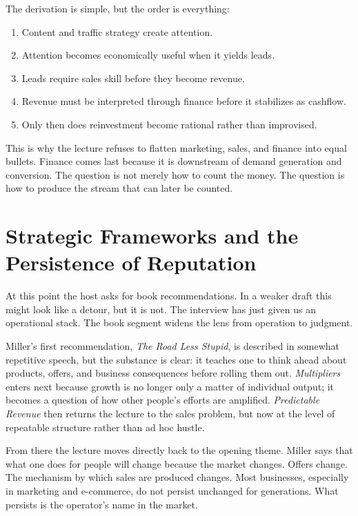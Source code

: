 The derivation is simple, but the order is everything:
\begin{enumerate}
\item Content and traffic strategy create attention.
\item Attention becomes economically useful when it yields leads.
\item Leads require sales skill before they become revenue.
\item Revenue must be interpreted through finance before it stabilizes as cashflow.
\item Only then does reinvestment become rational rather than improvised.
\end{enumerate}

This is why the lecture refuses to flatten marketing, sales, and finance into equal bullets. Finance comes last because it is downstream of demand generation and conversion. The question is not merely how to count the money. The question is how to produce the stream that can later be counted.

\section{Strategic Frameworks and the Persistence of Reputation}

At this point the host asks for book recommendations. In a weaker draft this might look like a detour, but it is not. The interview has just given us an operational stack. The book segment widens the lens from operation to judgment.

Miller's first recommendation, \emph{The Road Less Stupid}, is described in somewhat repetitive speech, but the substance is clear: it teaches one to think ahead about products, offers, and business consequences before rolling them out. \emph{Multipliers} enters next because growth is no longer only a matter of individual output; it becomes a question of how other people's efforts are amplified. \emph{Predictable Revenue} then returns the lecture to the sales problem, but now at the level of repeatable structure rather than ad hoc hustle.

From there the lecture moves directly back to the opening theme. Miller says that what one does for people will change because the market changes. Offers change. The mechanism by which sales are produced changes. Most businesses, especially in marketing and e-commerce, do not persist unchanged for generations. What persists is the operator's name in the market.

